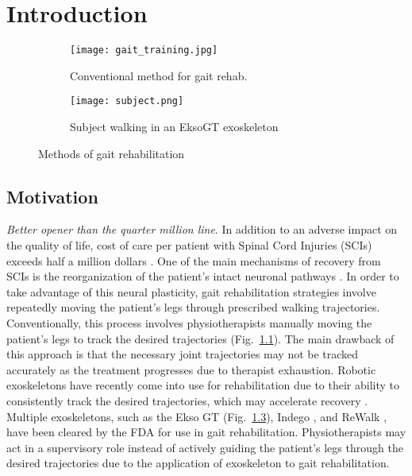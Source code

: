 \chapter{Introduction}

\begin{figure}
	\centering
	\begin{subfigure}{0.45\textwidth}
		\centering
		\texttt{[image: gait\_training.jpg]} %
		\caption{Conventional method for gait rehab. \cite{gaitrehabgantry}}\label{fig:gantry}
	\end{subfigure}\hfill
	\begin{subfigure}{0.45\textwidth}
		\centering
		\texttt{[image: subject.png]}
		\caption{Subject walking in an EksoGT exoskeleton}\label{fig:subject}
	\end{subfigure}
	\caption{Methods of gait rehabilitation}
\end{figure}

\section{Motivation}
%

\textit{Better opener than the quarter million line}. In addition to an adverse impact on the quality of life, cost of care per patient with Spinal Cord Injuries (SCIs) exceeds half a million dollars \cite{devivo2011costs}. One of the main mechanisms of recovery from SCIs is the reorganization of the patient's intact neuronal pathways \cite{curt2008recovery}. In order to take advantage of this neural plasticity, gait rehabilitation strategies involve repeatedly moving the patient's legs through prescribed walking trajectories. Conventionally, this process involves physiotherapists manually moving the patient's legs to track the desired trajectories (Fig.~\ref{fig:gantry}). The main drawback of this approach is that the necessary joint trajectories may not be tracked accurately as the treatment progresses due to therapist exhaustion. Robotic exoskeletons have recently come into use for rehabilitation due to their ability to consistently track the desired trajectories, which may accelerate recovery \cite{hidler2011role}. Multiple exoskeletons, such as the Ekso GT \cite{brenner2016exploring} (Fig.~\ref{fig:subject}), Indego \cite{sup2008design}, and ReWalk \cite{rewalk}, have been cleared by the FDA for use in gait rehabilitation. Physiotherapists may act in a supervisory role instead of actively guiding the patient's legs through the desired trajectories due to the application of exoskeleton to gait rehabilitation. 


